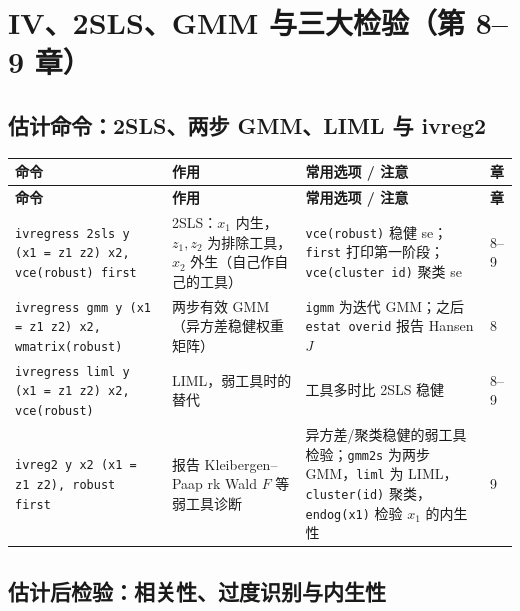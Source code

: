 \section{IV、2SLS、GMM 与三大检验（第 8–9 章）}\label{sec:UappB-iv}

\subsection{估计命令：2SLS、两步 GMM、LIML 与 ivreg2}

{\renewcommand{\arraystretch}{1.12}\begin{longtable}{@{}>{\raggedright\arraybackslash\small}p{5.3cm}>{\raggedright\arraybackslash\small}p{3.8cm}>{\raggedright\arraybackslash\small}p{5.3cm}>{\centering\arraybackslash\small}p{0.9cm}@{}}
\toprule
\textbf{命令} & \textbf{作用} & \textbf{常用选项 / 注意} & \textbf{章}\\
\midrule
\endfirsthead
\toprule
\textbf{命令} & \textbf{作用} & \textbf{常用选项 / 注意} & \textbf{章}\\
\midrule
\endhead
\bottomrule
\endlastfoot

\texttt{ivregress 2sls y (x1 = z1 z2) x2, vce(robust) first}\newline {\footnotesize\rmfamily [官方]} & 2SLS：$x_1$ 内生，$z_1,z_2$ 为排除工具，$x_2$ 外生（自己作自己的工具） & \texttt{vce(robust)} 稳健 se；\texttt{first} 打印第一阶段；\texttt{vce(cluster id)} 聚类 se & 8–9\\
\addlinespace[1pt]
\texttt{ivregress gmm y (x1 = z1 z2) x2, wmatrix(robust)} & 两步有效 GMM（异方差稳健权重矩阵） & \texttt{igmm} 为迭代 GMM；之后 \texttt{estat overid} 报告 Hansen $J$ & 8\\
\addlinespace[1pt]
\texttt{ivregress liml y (x1 = z1 z2) x2, vce(robust)} & LIML，弱工具时的替代 & 工具多时比 2SLS 稳健 & 8–9\\
\addlinespace[1pt]
\texttt{ivreg2 y x2 (x1 = z1 z2), robust first}\newline {\footnotesize\rmfamily [SSC]} & 报告 Kleibergen–Paap rk Wald $F$ 等弱工具诊断 & 异方差/聚类稳健的弱工具检验；\texttt{gmm2s} 为两步 GMM，\texttt{liml} 为 LIML，\texttt{cluster(id)} 聚类，\texttt{endog(x1)} 检验 $x_1$ 的内生性 & 9\\
\end{longtable}}


\subsection{估计后检验：相关性、过度识别与内生性}

